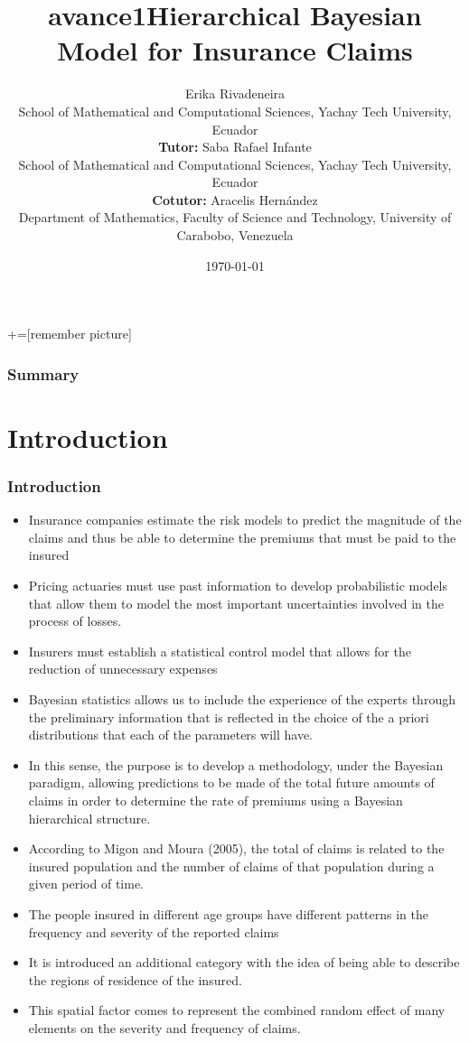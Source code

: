 \documentclass[10pt]{beamer} %
\title{avance1}
\title{Hierarchical Bayesian Model for Insurance Claims}
\author[]{Erika Rivadeneira\\ School of Mathematical and Computational Sciences, Yachay Tech University, Ecuador
\vspace{0.25cm}
\\{\small{\textbf{Tutor:} Saba Rafael Infante\\School of Mathematical and Computational Sciences, Yachay Tech University, Ecuador\\\textbf{Cotutor:} Aracelis Hernández\\Department of Mathematics, Faculty of Science and Technology, University of Carabobo, Venezuela}}}
\date{\today}
\begin{document}
+=[remember picture]
\lstset{}   
\everymath{\displaystyle}

\begin{frame}
	\titlepage
\end{frame}

\begin{frame}
\frametitle{Summary}
\tableofcontents
\end{frame}

\section{Introduction}

\begin{frame}
\frametitle[9pt]{Introduction}
\begin{itemize}
    \item Insurance companies estimate the risk models to predict the magnitude of the claims and thus be able to determine the premiums that must be paid to the insured
    \item Pricing actuaries must use past information to develop probabilistic models that allow them to model the most important uncertainties involved in the process of losses. 
    \item Insurers must establish a statistical control model that allows for the reduction of unnecessary expenses
    \item Bayesian statistics allows us to include the experience of the experts through the preliminary information that is reflected in the choice of the a priori distributions that each of the parameters will have.
    
\end{itemize}

\end{frame}
\begin{frame}
\begin{itemize}
    \item In this sense, the purpose is to develop a methodology, under the Bayesian paradigm, allowing predictions to be made of the total future amounts of claims in order to determine the rate of premiums using a Bayesian hierarchical structure.
    \item According to Migon and Moura (2005), the total of claims is related to the insured population and the number of claims of that population during a given period of time.
    \item The people insured in different age groups have different patterns in the frequency and severity of the reported claims
    \item It is introduced an additional category with the idea of being able to describe the regions of residence of the insured. 
    \item This spatial factor comes to represent the combined random effect of many elements on the severity and frequency of claims. 
\end{itemize}
\end{frame}
\end{document}
